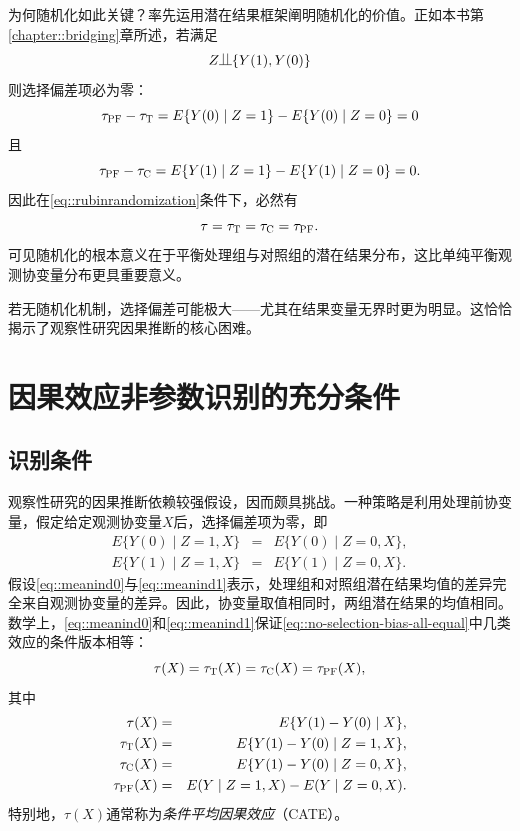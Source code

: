  
 
 
 为何随机化如此关键？\citet{rubin1978bayesian}率先运用潜在结果框架阐明随机化的价值。正如本书第\ref{chapter::bridging}章所述，若满足
\begin{equation}\label{eq::rubinrandomization}
 Z  \ind \{ Y (1) , Y (0) \}
\end{equation}
则选择偏差项必为零：
$$
  \tau_\textsc{PF} - \tau_\textsc{T}  = 
 E\{   Y(0)  \mid Z = 1 \} - E\{   Y(0)  \mid Z = 0 \}  = 0
 $$
且
$$
   \tau_\textsc{PF} - \tau_\textsc{C} =
 E\{   Y(1)  \mid Z = 1 \} - E\{   Y(1)  \mid Z = 0 \}  = 0. 
 $$
因此在\eqref{eq::rubinrandomization}条件下，必然有
\begin{equation}
\label{eq::no-selection-bias-all-equal}
 \tau = \tau_\textsc{T} = \tau_\textsc{C} = \tau_\textsc{PF}.
\end{equation}
可见随机化的根本意义在于平衡处理组与对照组的潜在结果分布，这比单纯平衡观测协变量分布更具重要意义。 
 

若无随机化机制，选择偏差可能极大——尤其在结果变量无界时更为明显。这恰恰揭示了观察性研究因果推断的核心困难。 


\section{因果效应非参数识别的充分条件} 
 
 
 
\subsection{识别条件}\label{sec::identification-ignorability}
 
 
 观察性研究的因果推断依赖较强假设，因而颇具挑战。一种策略是利用处理前协变量，假定给定观测协变量$X$后，选择偏差项为零，即
\begin{eqnarray}
\label{eq::meanind0} E\{   Y(0)  \mid Z = 1, X \} &=& E\{   Y(0)  \mid Z = 0, X \}  ,\\
\label{eq::meanind1} E\{   Y(1)  \mid Z = 1 , X\} &=& E\{   Y(1)  \mid Z = 0, X \}   . 
\end{eqnarray}
假设\eqref{eq::meanind0}与\eqref{eq::meanind1}表示，处理组和对照组潜在结果均值的差异完全来自观测协变量的差异。因此，协变量取值相同时，两组潜在结果的均值相同。数学上，\eqref{eq::meanind0}和\eqref{eq::meanind1}保证\eqref{eq::no-selection-bias-all-equal}中几类效应的条件版本相等：
$$
 \tau(X) = \tau_\textsc{T}(X) =  \tau_\textsc{C}(X) = \tau_\textsc{PF}(X),
 $$
其中
\begin{eqnarray*}
 \tau(X)  &=& E\{ Y(1) - Y(0) \mid X  \}, \\
 \tau_\textsc{T}(X) &=&  E\{ Y(1) - Y(0) \mid Z=1,  X  \},\\
  \tau_\textsc{C}(X) &=& E\{ Y(1) - Y(0) \mid Z=0,  X  \},\\
   \tau_\textsc{PF}(X) &=& E(Y\mid Z=1, X) - E(Y\mid Z=0, X).
\end{eqnarray*}
特别地，$ \tau(X) $通常称为{\it 条件平均因果效应}（CATE）。 



